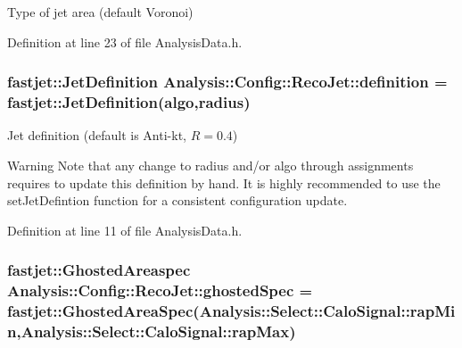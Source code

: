 Type of jet area (default Voronoi) 



Definition at line 23 of file Analysis\+Data.\+h.

\subsubsection[{\texorpdfstring{definition}{definition}}]{\setlength{\rightskip}{0pt plus 5cm}fastjet\+::\+Jet\+Definition Analysis\+::\+Config\+::\+Reco\+Jet\+::definition = fastjet\+::\+Jet\+Definition({\bf algo},{\bf radius})\hspace{0.3cm}{\ttfamily [static]}}\hypertarget{namespaceAnalysis_1_1Config_1_1RecoJet_ae0c23bbd5e0420037cbbb9f7929da17f}{}\label{namespaceAnalysis_1_1Config_1_1RecoJet_ae0c23bbd5e0420037cbbb9f7929da17f}


Jet definition (default is Anti-\/kt, $ R = 0.4 $) 

\begin{DoxyWarning}{Warning}
Note that any change to {\ttfamily radius} and/or {\ttfamily algo} through assignments requires to update this definition by hand. It is highly recommended to use the {\ttfamily set\+Jet\+Defintion} function for a consistent configuration update. 
\end{DoxyWarning}


Definition at line 11 of file Analysis\+Data.\+h.

\subsubsection[{\texorpdfstring{ghosted\+Spec}{ghostedSpec}}]{\setlength{\rightskip}{0pt plus 5cm}fastjet\+::\+Ghosted\+Areaspec Analysis\+::\+Config\+::\+Reco\+Jet\+::ghosted\+Spec = fastjet\+::\+Ghosted\+Area\+Spec({\bf Analysis\+::\+Select\+::\+Calo\+Signal\+::rap\+Min},{\bf Analysis\+::\+Select\+::\+Calo\+Signal\+::rap\+Max})\hspace{0.3cm}{\ttfamily [static]}}\hypertarget{namespaceAnalysis_1_1Config_1_1RecoJet_a319c43bb7084593808400c0ac0b2f5a6}{}\label{namespaceAnalysis_1_1Config_1_1RecoJet_a319c43bb7084593808400c0ac0b2f5a6}


